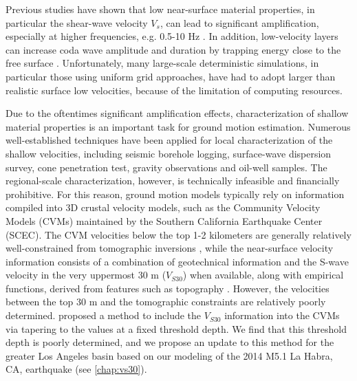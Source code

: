 Previous studies have shown that low near-surface material properties, in particular the shear-wave velocity $V_s$, can lead to significant amplification, especially at higher frequencies, e.g. 0.5-10 Hz \citep{booreSiteAmplificationsGeneric1997,poggiDerivationReferenceShearWave2011}. In addition, low-velocity layers can increase coda wave amplitude and duration by trapping energy close to the free surface \citep{imperatoriBroadbandNearfieldGround2013}. Unfortunately, many large-scale deterministic simulations, in particular those using uniform grid approaches, have had to adopt larger than realistic surface low velocities, because of the limitation of computing resources.

Due to the oftentimes significant amplification effects, characterization of shallow material properties is an important task for ground motion estimation. Numerous well-established techniques have been applied for local characterization of the shallow velocities, including seismic borehole logging, surface-wave dispersion survey, cone penetration test, gravity observations and oil-well samples. The regional-scale characterization, however, is technically infeasible and financially prohibitive. For this reason, ground motion models typically rely on information compiled into 3D crustal velocity models, such as the Community Velocity Models (CVMs) maintained by the Southern California Earthquake Center (SCEC). The CVM velocities below the top 1-2 kilometers are generally relatively well-constrained from tomographic inversions , while the near-surface velocity information consists of a combination of geotechnical information and the S-wave velocity in the very uppermost 30 m ($V_{S30}$) when available, along with empirical functions, derived from features such as topography . However, the velocities between the top 30 m and the tomographic constraints are relatively poorly determined. \citet{elyVs30derivedNearsurfaceSeismic2010} proposed a method to include the $V_{S30}$ information into the CVMs via tapering to the values at a fixed threshold depth. We find that this threshold depth is poorly determined, and we propose an update to this method for the greater Los Angeles basin based on our modeling of the 2014 M5.1 La Habra, CA, earthquake (see \cref{chap:vs30}). 




